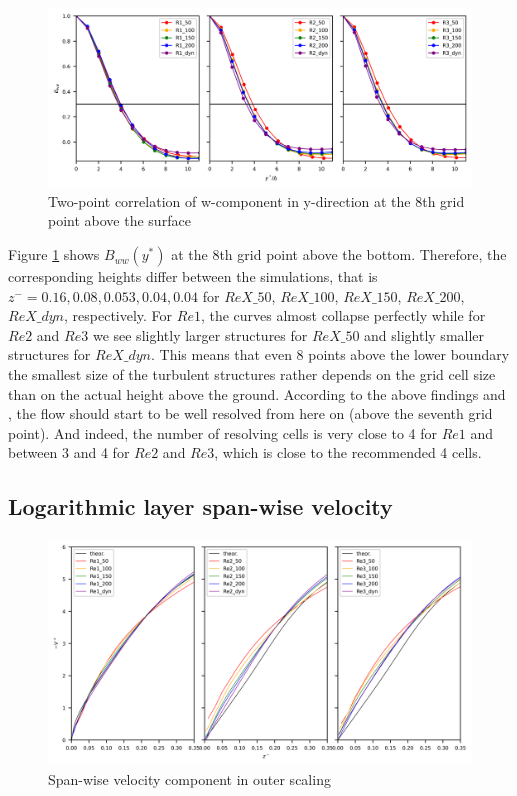\documentclass[draft,a4paper,11pt]{article}
\begin{document}
\begin{figure}[ht]
  \centerline{
	\includegraphics[width=\textwidth]{figures_2024/d3y_2pc_ww_3Re_4.png}
}
  \caption{Two-point correlation of w-component in y-direction at the 8th grid point above the surface}
  \label{2pc_4}
\end{figure}

Figure \ref{2pc_4} shows $B_{ww}(y^*)$ at the 8th grid point above the bottom. Therefore, the corresponding heights differ between the simulations, that is $z^-=0.16, 0.08, 0.053, 0.04, 0.04$ for $ReX\_50$, $ReX\_100$, $ReX\_150$, $ReX\_200$, $ReX\_dyn$, respectively. For $Re1$, the curves almost collapse perfectly while for $Re2$ and $Re3$ we see slightly larger structures for $ReX\_50$ and slightly smaller structures for $ReX\_dyn$. This means that even 8 points above the lower boundary the smallest size of the turbulent structures rather depends on the grid cell size than on the actual height above the ground. According to the above findings and \cite{maronga2014monin}, the flow should start to be well resolved from here on (above the seventh grid point). And indeed, the number of resolving cells is very close to 4 for $Re1$ and between 3 and 4 for $Re2$ and $Re3$, which is close to the recommended 4 cells.

%
\subsection{Logarithmic layer span-wise velocity}

\begin{figure}[ht]
  \centerline{
	\includegraphics[width=\textwidth]{figures_2024/d3y_3Re_v_outer_lin.png}
}
  \caption{Span-wise velocity component in outer scaling}
  \label{3Re_v_lin}
\end{figure}
\end{document}
